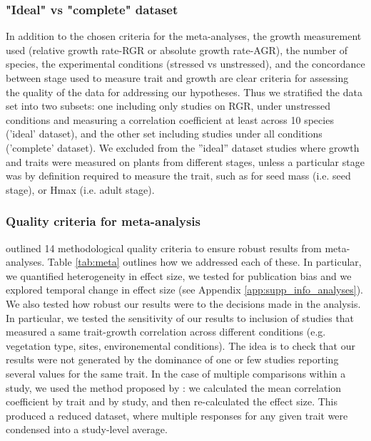 \documentclass[a4paper,11pt]{article}
\begin{document}
\subsubsection*{"Ideal" vs "complete" dataset}\label{ideal-vs-complete-dataset}

In addition to the chosen criteria for the meta-analyses, the growth measurement used (relative growth rate-RGR or absolute growth rate-AGR), the number of species, the experimental conditions (stressed vs unstressed), and the concordance between stage used to measure trait and growth are clear criteria for assessing the quality of the data for addressing our hypotheses. Thus we stratified the data set into two subsets: one including only studies on RGR, under unstressed conditions and measuring a correlation coefficient at least across 10 species (’ideal’ dataset), and the other set including studies under all conditions (’complete’ dataset). We excluded from the ”ideal” dataset studies where growth and traits were measured on plants from different stages, unless a particular stage was by definition required to measure the trait, such as for seed mass (i.e. seed stage), or Hmax (i.e. adult stage).

\subsubsection*{Quality criteria for meta-analysis}

\cite{Koricheva:2014ku} outlined 14 methodological quality criteria to ensure robust results from meta-analyses. Table \ref{tab:meta} outlines how we addressed each of these. In particular, we quantified heterogeneity in effect size, we tested for publication bias and we explored temporal change in effect size (see Appendix \ref{app:supp_info_analyses}).
We also tested how robust our results were to the decisions made in the analysis. In particular, we tested the sensitivity of our results to inclusion of studies that measured a same trait-growth correlation across different conditions (e.g. vegetation type, sites, environemental conditions). The idea is to check that our results were not generated by the dominance of one or few studies reporting several values for the same trait. In the case of multiple comparisons within a study, we used the method proposed by \citet{Borenstein:2009um}: we calculated the mean correlation coefficient by trait and by study, and then re-calculated the effect size. This produced a reduced dataset, where multiple responses for any given trait were condensed into a study-level average.
\end{document}
